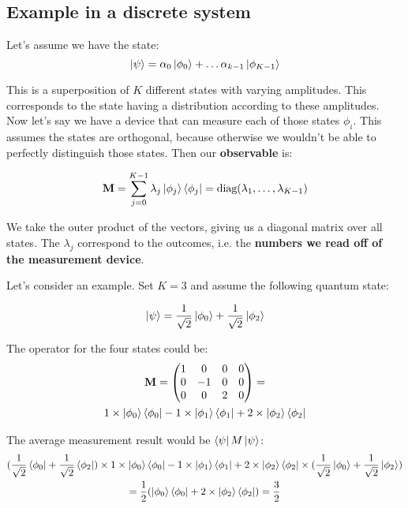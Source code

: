 \documentclass{article}
\begin{document}
\subsection{Example in a discrete system}
Let's assume we have the state:
\begin{equation}
    \ket{\psi} = \alpha_0 \ket{\phi_0} + \dots \alpha_{k - 1} \ket{\phi_{K - 1}}
\end{equation}

This is a superposition of $K$ different states with varying amplitudes. This corresponds to the state having a distribution according to these amplitudes. Now let's say we have a device that can measure each of those states $\phi_i$. This assumes the states are orthogonal, because otherwise we wouldn't be able to perfectly distinguish those states. Then our \textbf{observable} is:

\begin{equation*}
    \textbf{M} = \sum_{j = 0}^{K - 1} \lambda_j
        \ket{\phi_j}\bra{\phi_j} = \text{diag}(\lambda_1, \dots, \lambda_{K - 1})
\end{equation*}

We take the outer product of the vectors, giving us a diagonal matrix over all states. The $\lambda_j$ correspond to the outcomes, i.e. the 
\textbf{numbers we read off of the measurement device}. 

Let's consider an example. Set $K = 3$ and assume the following quantum state:

\begin{equation*}
    \ket{\psi} = \frac{1}{\sqrt{2}}\ket{\phi_0} + \frac{1}{\sqrt{2}} \ket{\phi_2}
\end{equation*}

The operator for the four states could be:
\begin{gather*}
    \textbf{M} = \begin{pmatrix}
        1 & 0 & 0 & 0 \\
        0 & -1 & 0 & 0 \\
        0 & 0 & 2 & 0
    \end{pmatrix} = \\ 1 \times \ket{\phi_0}\bra{\phi_0} - 1 \times \ket{\phi_1}\bra{\phi_1} + 2 \times \ket{\phi_2}\bra{\phi_2}
\end{gather*}

The average measurement result would be $\bra{\psi} M \ket{\psi}$: 
\begin{gather*}
    (\frac{1}{\sqrt{2}}\bra{\phi_0} + \frac{1}{\sqrt{2}} \bra{\phi_2}) \times 1 \times \ket{\phi_0}\bra{\phi_0} - 1 \times \ket{\phi_1}\bra{\phi_1} + 2 \times \ket{\phi_2}\bra{\phi_2} \times (\frac{1}{\sqrt{2}}\ket{\phi_0} + \frac{1}{\sqrt{2}} \ket{\phi_2}) \\
    = \frac{1}{2} (\ket{\phi_0} \bra{\phi_0} + 2 \times \ket{\phi_2}\bra{\phi_2}) = \frac{3}{2}
\end{gather*}
\end{document}
